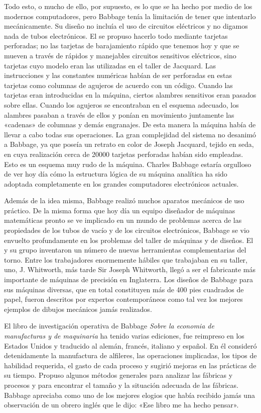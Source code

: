 \documentclass[a4paper, 12pt]{article}
\begin{document}
Todo esto, o mucho de ello, por supuesto, es lo que se ha hecho por medio de los modernos computadores, pero Babbage tenía la limitación de tener que intentarlo mecánicamente. Su diseño no incluía el uso de circuitos eléctricos y no digamos nada de tubos electrónicos. El se propuso hacerlo todo mediante tarjetas perforadas; no las tarjetas de barajamiento rápido que tenemos hoy y que se mueven a través de rápidos y manejables circuitos sensitivos eléctricos, sino tarjetas cuyo modelo eran las utilizadas en el taller de Jacquard. Las instrucciones y las constantes numéricas habían de ser perforadas en estas tarjetas como columnas de agujeros de acuerdo con un código. Cuando las tarjetas eran introducidas en la máquina, ciertos alambres sensitivos eran pasados sobre ellas. Cuando los agujeros se encontraban en el esquema adecuado, los alambres pasaban a través de ellos y ponían en movimiento juntamente las «cadenas» de columnas y demás engranajes. De esta manera la máquina había de llevar a cabo todas sus operaciones. La gran complejidad del sistema no desanimó a Babbage, ya que poseía un retrato en color de Joseph Jacquard, tejido en seda, en cuya realización cerca de 20000 tarjetas perforadas habían sido empleadas. Esto es un esquema muy rudo de la máquina. Charles Babbage estaría orgulloso de ver hoy día cómo la estructura lógica de su máquina analítica ha sido adoptada completamente en los grandes computadores electrónicos actuales.

Además de la idea misma, Babbage realizó muchos aparatos mecánicos de uso  práctico. De la misma forma que hoy día un equipo diseñador de máquinas matemáticas pronto se ve implicado en un mundo de problemas acerca de las propiedades de los tubos de vacío y de los circuitos electrónicos, Babbage se vio envuelto profundamente en los problemas del taller de máquinas y de diseños. El y su grupo inventaron un número de nuevas herramientas complementarias del torno. Entre los trabajadores enormemente hábiles que trabajaban en su taller, uno, J. Whitworth, más tarde Sir Joseph Whitworth, llegó a ser el fabricante más
importante de máquinas de precisión en Inglaterra. Los diseños de Babbage para sus máquinas diversas, que en total constituyen más de 400 pies cuadrados de papel, fueron descritos por expertos contemporáneos como tal vez los mejores ejemplos de dibujos mecánicos jamás realizados.

El libro de investigación operativa de Babbage {\it Sobre la economia de manufacturas y de maquinaria} ha tenido varias ediciones, fue reimpreso en los Estados Unidos y traducido al alemán, francés, italiano y español. En él consideró detenidamente la manufactura de alfileres, las operaciones implicadas, los tipos de habilidad requerida, el gasto de cada proceso y sugirió mejoras en las prácticas de su tiempo. Propuso algunos métodos generales para analizar las fábricas y procesos y para encontrar el tamaño y la situación adecuada de las fábricas. Babbage apreciaba como uno de los mejores elogios que había recibido jamás una observación de un obrero inglés que le dijo: «Ese libro me ha hecho pensar».
\end{document}

